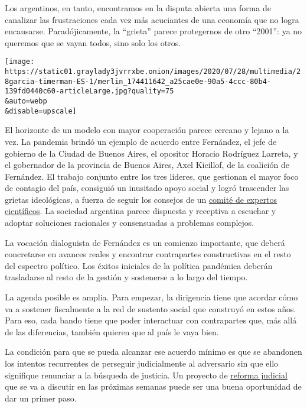 Los argentinos, en tanto, encontramos en la disputa abierta una forma de
canalizar las frustraciones cada vez más acuciantes de una economía que
no logra encausarse. Paradójicamente, la ``grieta'' parece protegernos
de otro ``2001'': ya no queremos que se vayan todos, sino solo los
otros.

\texttt{[image: https://static01.graylady3jvrrxbe.onion/images/2020/07/28/multimedia/28garcia-timerman-ES-1/merlin\_174411642\_a25cae0e-90a5-4ccc-80b4-139fd0440c60-articleLarge.jpg?quality=75\\\&auto=webp\\\&disable=upscale]}

El horizonte de un modelo con mayor cooperación parece cercano y lejano
a la vez. La pandemia brindó un ejemplo de acuerdo entre Fernández, el
jefe de gobierno de la Ciudad de Buenos Aires, el opositor Horacio
Rodríguez Larreta, y el gobernador de la provincia de Buenos Aires, Axel
Kicillof, de la coalición de Fernández. El trabajo conjunto entre los
tres líderes, que gestionan el mayor foco de contagio del país,
consiguió un inusitado apoyo social y logró trascender las grietas
ideológicas, a fuerza de seguir los consejos de un
\href{https://www.perfil.com/noticias/politica/coronavirus-medicos-quien-es-quien-en-el-comite-de-expertos-que-asesora-a-alberto-fernandez.phtml}{comité
de expertos científicos}. La sociedad argentina parece dispuesta y
receptiva a escuchar y adoptar soluciones racionales y consensuadas a
problemas complejos.

La vocación dialoguista de Fernández es un comienzo importante, que
deberá concretarse en avances reales y encontrar contrapartes
constructivas en el resto del espectro político. Los éxitos iniciales de
la política pandémica deberán trasladarse al resto de la gestión y
sostenerse a lo largo del tiempo.

La agenda posible es amplia. Para empezar, la dirigencia tiene que
acordar cómo va a sostener fiscalmente a la red de sustento social que
construyó en estos años. Para eso, cada bando tiene que poder
interactuar con contrapartes que, más allá de las diferencias, también
quieren que al país le vaya bien.

La condición para que se pueda alcanzar ese acuerdo mínimo es que se
abandonen los intentos recurrentes de perseguir judicialmente al
adversario sin que ello signifique renunciar a la búsqueda de justicia.
Un proyecto de
\href{https://www.nytimes3xbfgragh.onion/es/2020/06/30/espanol/opinion/espionaje-argentina.html}{reforma
judicial} que se va a discutir en las próximas semanas puede ser una
buena oportunidad de dar un primer paso.

